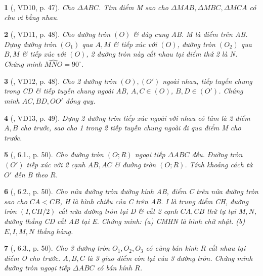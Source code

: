 \documentclass{article}
\newtheorem{baitoan}{}
\begin{document}
\begin{baitoan}[\cite{TLCT_THCS_Toan_9_hinh_hoc}, VD10, p. 47]
	Cho $\Delta ABC$. Tìm điểm M sao cho $\Delta MAB,\Delta MBC,\Delta MCA$ có chu vi bằng nhau.
\end{baitoan}

\begin{baitoan}[\cite{TLCT_THCS_Toan_9_hinh_hoc}, VD11, p. 48]
	Cho đường tròn $(O)$ \& dây cung AB. M là điểm trên AB. Dựng đường tròn $(O_1)$ qua $A,M$ \& tiếp xúc với $(O)$, đường tròn $(O_2)$ qua $B,M$ \& tiếp xúc với $(O)$, 2 đường tròn này cắt nhau tại điểm thứ 2 là N. Chứng minh $\widehat{MNO} = 90^\circ$.
\end{baitoan}

\begin{baitoan}[\cite{TLCT_THCS_Toan_9_hinh_hoc}, VD12, p. 48]
	Cho 2 đường tròn $(O),(O')$ ngoài nhau, tiếp tuyến chung trong CD \& tiếp tuyến chung ngoài AB, $A,C\in(O)$, $B,D\in(O')$. Chứng minh $AC,BD,OO'$ đồng quy.
\end{baitoan}

\begin{baitoan}[\cite{TLCT_THCS_Toan_9_hinh_hoc}, VD13, p. 49]
	Dựng 2 đường tròn tiếp xúc ngoài với nhau có tâm là 2 điểm $A,B$ cho trước, sao cho 1 trong 2 tiếp tuyến chung ngoài đi qua điểm M cho trước.
\end{baitoan}

\begin{baitoan}[\cite{TLCT_THCS_Toan_9_hinh_hoc}, 6.1., p. 50]
	Cho đường tròn $(O;R)$ ngoại tiếp $\Delta ABC$ đều. Đường tròn $(O')$ tiếp xúc với 2 cạnh $AB,AC$ \& đường tròn $(O;R)$. Tính khoảng cách từ $O'$ đến B theo $R$.
\end{baitoan}

\begin{baitoan}[\cite{TLCT_THCS_Toan_9_hinh_hoc}, 6.2., p. 50]
	Cho nửa đường tròn đường kính AB, điểm C trên nửa đường tròn sao cho $CA < CB$, H là hình chiếu của C trên AB. I là trung điểm CH, đường tròn $(I,CH/2)$ cắt nửa đường tròn tại D \& cắt 2 cạnh $CA,CB$ thứ tự tại $M,N$, đường thẳng CD cắt AB tại E. Chứng minh: (a) CMHN là hình chữ nhật. (b) $E,I,M,N$ thẳng hàng.
\end{baitoan}

\begin{baitoan}[\cite{TLCT_THCS_Toan_9_hinh_hoc}, 6.3., p. 50]
	Cho 3 đường tròn $O_1,O_2,O_3$ có cùng bán kính $R$ cắt nhau tại điểm O cho trước. $A,B,C$ là 3 giao điểm còn lại của 3 đường tròn. Chứng minh đường tròn ngoại tiếp $\Delta ABC$ có bán kính $R$.
\end{baitoan}
\end{document}
